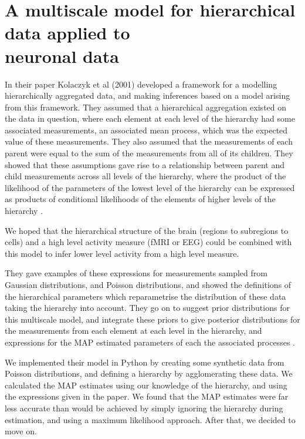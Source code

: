 \section{A multiscale model for hierarchical data applied to \\ neuronal data}
In their paper Kolaczyk et al (2001) developed a framework for a modelling hierarchically aggregated data, and making inferences based on a model arising from this framework. They assumed that a hierarchical aggregation existed on the data in question, where each element at each level of the hierarchy had some associated measurements, an associated mean process, which was the expected value of these measurements. They also assumed that the measurements of each parent were equal to the sum of the measurements from all of its children. They showed that these assumptions gave rise to a relationship between parent and child measurements across all levels of the hierarchy, where the product of the likelihood of the parameters of the lowest level of the hierarchy can be expressed as products of conditional likelihoods of the elements of higher levels of the hierarchy \parencite{kolaczyk}.

We hoped that the hierarchical structure of the brain (regions to subregions to cells) and a high level activity measure (fMRI or EEG) could be combined with this model to infer lower level activity from a high level measure.  

They gave examples of these expressions for measurements sampled from Gaussian distributions, and Poisson distributions, and showed the definitions of the hierarchical parameters which reparametrise the distribution of these data taking the hierarchy into account. They go on to suggest prior distributions for this multiscale model, and integrate these priors to give posterior distributions for the measurements from each element at each level in the hierarchy, and expressions for the MAP estimated parameters of each the associated processes \parencite{kolaczyk}.

We implemented their model in Python by creating some synthetic data from Poisson distributions, and defining a hierarchy by agglomerating these data. We calculated the MAP estimates using our knowledge of the hierarchy, and using the expressions given in the paper. We found that the MAP estimates were far less accurate than would be achieved by simply ignoring the hierarchy during estimation, and using a maximum likelihood approach. After that, we decided to move on.
